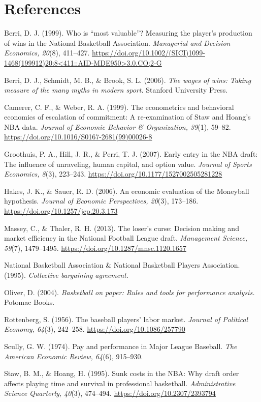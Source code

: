 \documentclass[12pt,letterpaper]{article}
\newenvironment{references}
  {\section*{References}\small\setlength{\parindent}{0pt}%
   \setlength{\parskip}{0.6em}\everypar{\hangindent=0.5in \hangafter=1}}
  {\par}
\begin{document}
\begin{references}
Berri, D. J. (1999). Who is ``most valuable''? Measuring the player's production of wins in the National Basketball Association. \emph{Managerial and Decision Economics, 20}(8), 411--427. \url{https://doi.org/10.1002/(SICI)1099-1468(199912)20:8<411::AID-MDE950>3.0.CO;2-G}

Berri, D. J., Schmidt, M. B., \& Brook, S. L. (2006). \emph{The wages of wins: Taking measure of the many myths in modern sport.} Stanford University Press.

Camerer, C. F., \& Weber, R. A. (1999). The econometrics and behavioral economics of escalation of commitment: A re-examination of Staw and Hoang's NBA data. \emph{Journal of Economic Behavior \& Organization, 39}(1), 59--82. \url{https://doi.org/10.1016/S0167-2681(99)00026-8}

Groothuis, P. A., Hill, J. R., \& Perri, T. J. (2007). Early entry in the NBA draft: The influence of unraveling, human capital, and option value. \emph{Journal of Sports Economics, 8}(3), 223--243. \url{https://doi.org/10.1177/1527002505281228}

Hakes, J. K., \& Sauer, R. D. (2006). An economic evaluation of the Moneyball hypothesis. \emph{Journal of Economic Perspectives, 20}(3), 173--186. \url{https://doi.org/10.1257/jep.20.3.173}

Massey, C., \& Thaler, R. H. (2013). The loser's curse: Decision making and market efficiency in the National Football League draft. \emph{Management Science, 59}(7), 1479--1495. \url{https://doi.org/10.1287/mnsc.1120.1657}

National Basketball Association \& National Basketball Players Association. (1995). \emph{Collective bargaining agreement.}

Oliver, D. (2004). \emph{Basketball on paper: Rules and tools for performance analysis.} Potomac Books.

Rottenberg, S. (1956). The baseball players' labor market. \emph{Journal of Political Economy, 64}(3), 242--258. \url{https://doi.org/10.1086/257790}

Scully, G. W. (1974). Pay and performance in Major League Baseball. \emph{The American Economic Review, 64}(6), 915--930.

Staw, B. M., \& Hoang, H. (1995). Sunk costs in the NBA: Why draft order affects playing time and survival in professional basketball. \emph{Administrative Science Quarterly, 40}(3), 474--494. \url{https://doi.org/10.2307/2393794}
\end{references}
\end{document}

